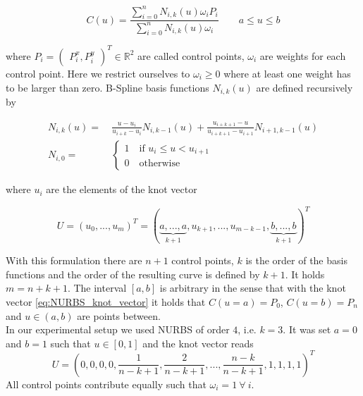 \documentclass{scrartcl}[12pt, halfparskip]
\numberwithin{equation}{section}
\numberwithin{figure}{section}
\numberwithin{table}{section}
\begin{document}
\begin{equation}
	C(u) = \frac{\sum_{i=0}^{n} N_{i,k}(u) \omega_i P_i }{\sum_{i=0}^{n} N_{i,k}(u) \omega_i} \qquad a \le u \le b
\end{equation}

where $P_i = \begin{pmatrix}
P_i^x, P_i^y \end{pmatrix}^T \in \mathbb{R}^2$ are called control points, $\omega_i$ are weights for each control point. Here we restrict ourselves to $\omega_i \ge 0$ where at least one weight has to be larger than zero.
B-Spline basis functions $N_{i,k}(u)$ are defined recursively by

\begin{align}
	N_{i,k}(u) = & \ \frac{u - u_i}{u_{i+k} - u_i} N_{i,k-1}(u) + \frac{u_{i+k+1} - u}{u_{i+k+1} - u_{i+1}} N_{i+1,k-1}(u) \label{eq:NURBS_basis_polynomial} \\[1ex]
	N_{i,0} = & \
	\begin{cases}
		1 \quad \text{if } u_i \le u < u_{i+1} \\
		0 \quad \text{otherwise}
	\end{cases} \nonumber
\end{align}

where $u_i$ are the elements of the knot vector

\begin{equation}
	U = (u_0,...,u_m)^T =
	(\underbrace{a,...,a}_{k+1},u_{k+1},...,u_{m-k-1},\underbrace{b,...,b}_{k+1})^T
	\label{eq:NURBS_knot_vector}
\end{equation}

With this formulation there are $n+1$ control points, $k$ is the order of the basis functions and the order of the resulting curve is defined by $k+1$. It holds ${m=n+k+1}$. The interval $[a,b]$ is arbitrary in the sense that with the knot vector \cref{eq:NURBS_knot_vector} it holds that $C(u=a)=P_0$, $C(u=b)=P_n$ and $u \in (a,b)$ are points between. \\

In our experimental setup we used NURBS of order $4$, i.e. $k=3$. It was set $a=0$ and $b=1$ such that $u \in [0,1]$ and the knot vector reads
\begin{equation}
	U = \left(0,0,0,0,\frac{1}{n-k+1},\frac{2}{n-k+1},...,\frac{n-k}{n-k+1},1,1,1,1\right)^T 
\end{equation}
All control points contribute equally such that $\omega_i=1 \ \forall \ i$. 
\end{document}
